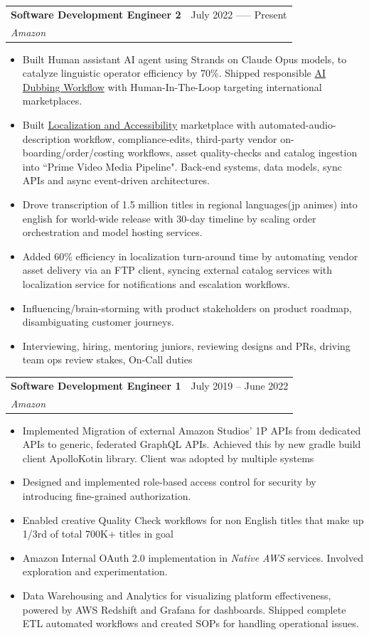 \documentclass[letterpaper,11pt]{article}
\makeatletter
\newcommand{\resumeItem}[1]{
  \item\small{
    {#1 \vspace{-2pt}}
  }
}
\newcommand{\resumeSubheading}[4]{
  \vspace{-2pt}\item
    \begin{tabular*}{0.97\textwidth}[t]{l@{\extracolsep{\fill}}r}
      \textbf{#1} & #2 \\
      \textit{\small#3} & \textit{\small #4} \\
    \end{tabular*}\vspace{-7pt}
}
\newcommand{\resumeSubSubheading}[2]{
    \item
    \begin{tabular*}{0.97\textwidth}{l@{\extracolsep{\fill}}r}
      \textit{\small#1} & \textit{\small #2} \\
    \end{tabular*}\vspace{-7pt}
}
\newcommand{\resumeSubHeadingListEnd}{\end{itemize}}
\newcommand{\resumeItemListStart}{\begin{itemize}}
\newcommand{\resumeItemListEnd}{\end{itemize}\vspace{-5pt}}
\makeatother
\begin{document}
    \resumeSubheading
      {Software Development Engineer 2}{July 2022 ----- Present}
      {Amazon}{}
      \resumeItemListStart
        \resumeItem {Built Human assistant AI agent using Strands on Claude Opus models, to catalyze linguistic operator efficiency by 70\%. Shipped responsible \href{https://www.aboutamazon.com/news/entertainment/prime-video-ai-dubbing-english-spanish}{{\color{blue}AI Dubbing Workflow}} with Human-In-The-Loop targeting international marketplaces.}
        \resumeItem{Built \href{https://variety.com/2022/global/asia/amazon-prime-video-localization-strategy-asia-latin-america-kelly-day-1235386280/}{{\color{blue}Localization and Accessibility}} marketplace with automated-audio-description workflow, compliance-edits, third-party vendor on-boarding/order/costing workflows, asset quality-checks and catalog ingestion into ``Prime Video Media Pipeline". Back-end systems, data models, sync APIs and async event-driven architectures.}
        \resumeItem{Drove transcription of 1.5 million titles in regional languages(jp animes) into english for world-wide release with 30-day timeline by scaling order orchestration and model hosting services.}
        \resumeItem{Added 60\% efficiency in localization turn-around time by automating vendor asset delivery via an FTP client, syncing external catalog services with localization service for notifications and escalation workflows.}
        \resumeItem{Influencing/brain-storming with product stakeholders on product roadmap, disambiguating customer journeys.}
        \resumeItem{Interviewing, hiring, mentoring juniors, reviewing designs and PRs, driving team ops review stakes, On-Call duties}
      \resumeItemListEnd
      

    \resumeSubheading
      {Software Development Engineer 1}{July 2019 -- June 2022}
      {Amazon}{}
      \resumeItemListStart
        \resumeItem{Implemented Migration of external Amazon Studios' 1P APIs from dedicated APIs to generic, federated GraphQL APIs. Achieved this by new gradle build client ApolloKotin library. Client was adopted by multiple systems}
        \resumeItem{Designed and implemented role-based access control for security by introducing fine-grained authorization.}
        \resumeItem{Enabled creative Quality Check workflows for non English titles that make up 1/3rd of total 700K+ titles in goal}
        \resumeItem{Amazon Internal OAuth 2.0 implementation in \emph{Native AWS} services. Involved exploration and experimentation.}
        \resumeItem{Data Warehousing and Analytics for visualizing platform effectiveness, powered by AWS Redshift and Grafana for dashboards. Shipped complete ETL automated workflows and created SOPs for handling operational issues.}
    \resumeItemListEnd
\end{document}
